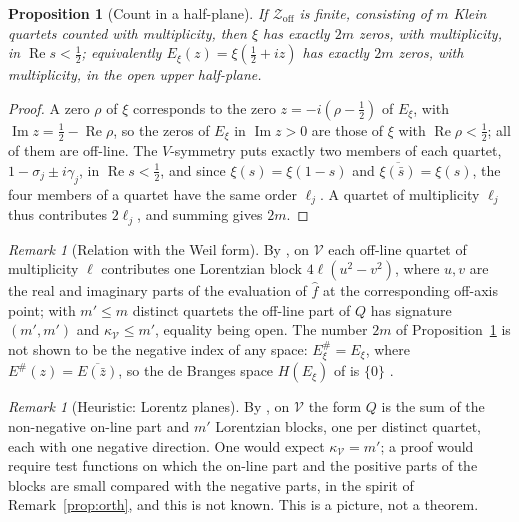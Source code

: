 \documentclass[11pt]{amsart}
\newtheorem{proposition}[theorem]{Proposition}
\theoremstyle{definition}
\theoremstyle{remark}
\newtheorem{remark}[theorem]{Remark}
\renewcommand{\Re}{\operatorname{Re}}
\renewcommand{\Im}{\operatorname{Im}}
\newcommand{\half}{\tfrac12}
\newcommand{\fhat}{\widehat f}
\newcommand{\Zoff}{\mathcal Z_{\mathrm{off}}}
\begin{document}
\begin{proposition}[Count in a half-plane]\label{thm:parity}
If $\Zoff$ is finite, consisting of $m$ Klein quartets counted with multiplicity, then $\xi$ has
exactly $2m$ zeros, with multiplicity, in $\Re s<\half$; equivalently $E_\xi(z)=\xi(\half+iz)$
has exactly $2m$ zeros, with multiplicity, in the open upper half-plane.
\end{proposition}
\begin{proof}
A zero $\rho$ of $\xi$ corresponds to the zero $z=-i(\rho-\half)$ of $E_\xi$, with
$\Im z=\half-\Re\rho$, so the zeros of $E_\xi$ in $\Im z>0$ are those of $\xi$ with
$\Re\rho<\half$; all of them are off-line. The $V$-symmetry puts exactly two members of each
quartet, $1-\sigma_j\pm i\gamma_j$, in $\Re s<\half$, and since $\xi(s)=\xi(1-s)$ and
$\overline{\xi(\bar s)}=\xi(s)$, the four members of a quartet have the same order $\ell_j$. A
quartet of multiplicity $\ell_j$ thus contributes $2\ell_j$, and summing gives $2m$.
\end{proof}

\begin{remark}[Relation with the Weil form]\label{rem:two}
By \cite[Thm.~3.1, Cor.~6.5]{Index}, on $\mathcal V$ each off-line quartet of multiplicity $\ell$
contributes one Lorentzian block $4\ell(u^2-v^2)$, where $u,v$ are the real and imaginary parts of
the evaluation of $\fhat$ at the corresponding off-axis point; with $m'\le m$ distinct quartets the
off-line part of $Q$ has signature $(m',m')$ and $\kappa_{\mathcal V}\le m'$, equality being open.
The number $2m$ of Proposition~\ref{thm:parity} is not shown to be the negative index of any
space: $E_\xi^\#=E_\xi$, where $E^\#(z)=\overline{E(\bar z)}$, so the de Branges space $H(E_\xi)$ of \cite{deBranges} is $\{0\}$
\cite[Rem.~6.6]{Index}.
\end{remark}

\begin{remark}[Heuristic: Lorentz planes]\label{thm:lorentz}
By \cite[Thm.~3.1]{Index}, on $\mathcal V$ the form $Q$ is the sum of the non-negative on-line part and $m'$ Lorentzian blocks, one per distinct quartet, each with one negative direction. One would expect $\kappa_{\mathcal V}=m'$; a proof would require test functions on which the on-line part and the positive parts of the blocks are small compared with the negative parts, in the spirit of Remark~\ref{prop:orth}, and this is not known. This is a picture, not a theorem.
\end{remark}
\end{document}
